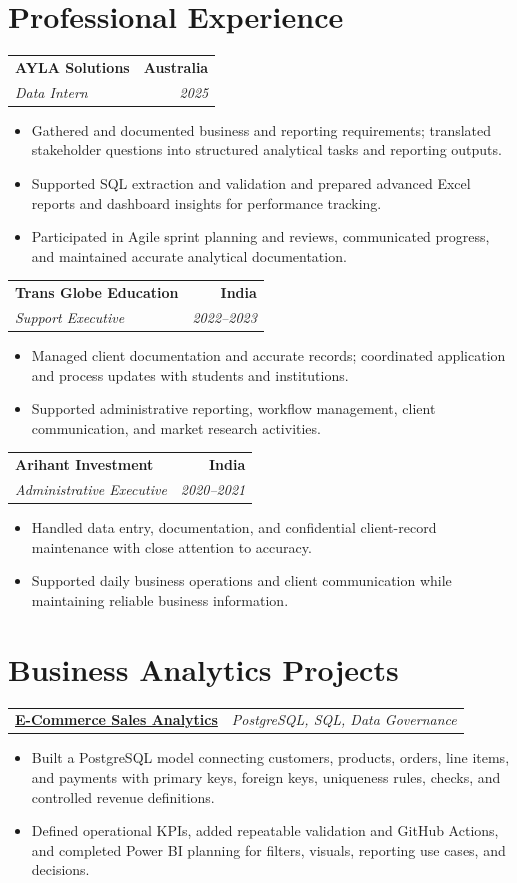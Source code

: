 \documentclass[letterpaper,10pt]{article}
\makeatletter
\newcommand{\role}[4]{%
  \begin{tabularx}{\textwidth}{@{}Xr@{}}
    \textbf{#1} & \textbf{#2} \\
    \textit{#3} & \textit{#4}
  \end{tabularx}\vspace{-1pt}
}
\newcommand{\project}[2]{%
  \begin{tabularx}{\textwidth}{@{}Xr@{}}
    \textbf{#1} & \textit{#2}
  \end{tabularx}\vspace{-1pt}
}
\makeatother
\begin{document}
\section{Professional Experience}
\role{AYLA Solutions}{Australia}{Data Intern}{2025}
\begin{itemize}
  \item Gathered and documented business and reporting requirements; translated stakeholder questions into structured analytical tasks and reporting outputs.
  \item Supported SQL extraction and validation and prepared advanced Excel reports and dashboard insights for performance tracking.
  \item Participated in Agile sprint planning and reviews, communicated progress, and maintained accurate analytical documentation.
\end{itemize}
\vspace{1pt}

\role{Trans Globe Education}{India}{Support Executive}{2022--2023}
\begin{itemize}
  \item Managed client documentation and accurate records; coordinated application and process updates with students and institutions.
  \item Supported administrative reporting, workflow management, client communication, and market research activities.
\end{itemize}
\vspace{1pt}

\role{Arihant Investment}{India}{Administrative Executive}{2020--2021}
\begin{itemize}
  \item Handled data entry, documentation, and confidential client-record maintenance with close attention to accuracy.
  \item Supported daily business operations and client communication while maintaining reliable business information.
\end{itemize}

\section{Business Analytics Projects}
\project{\href{https://github.com/jainalimehta/Ecommerce-Sales-Analytics}{E-Commerce Sales Analytics}}{PostgreSQL, SQL, Data Governance}
\begin{itemize}
  \item Built a PostgreSQL model connecting customers, products, orders, line items, and payments with primary keys, foreign keys, uniqueness rules, checks, and controlled revenue definitions.
  \item Defined operational KPIs, added repeatable validation and GitHub Actions, and completed Power BI planning for filters, visuals, reporting use cases, and decisions.
\end{itemize}
\vspace{1pt}
\end{document}
